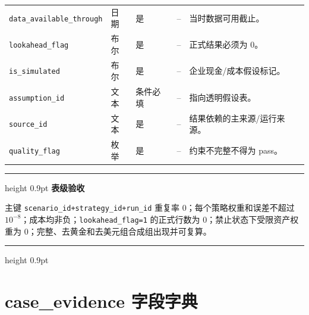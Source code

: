 \documentclass[UTF8,fontset=windows,12pt,openany]{ctexbook}
\newenvironment{gatebox}[1][]{%
  \par\medskip\noindent\begin{center}\begin{minipage}{0.93\textwidth}%
  \color{GoldLine}\hrule height 0.9pt\vspace{0.45em}%
  \textbf{#1}\par\smallskip\color{black}%
}{%
  \par\vspace{0.35em}\color{GoldLine}\hrule height 0.9pt%
  \end{minipage}\end{center}\medskip%
}
\newcommand{\Field}[1]{{\small\nolinkurl{#1}}}
\begin{document}
\begin{landscape}
\begin{longtable}{p{4.0cm}p{2.2cm}p{2.2cm}p{2.5cm}p{7.4cm}}
\Field{data_available_through} & 日期 & 是 & -- & 当时数据可用截止。\\
\Field{lookahead_flag} & 布尔 & 是 & -- & 正式结果必须为 0。\\
\Field{is_simulated} & 布尔 & 是 & -- & 企业现金/成本假设标记。\\
\Field{assumption_id} & 文本 & 条件必填 & -- & 指向透明假设表。\\
\Field{source_id} & 文本 & 是 & -- & 结果依赖的主来源/运行来源。\\
\Field{quality_flag} & 枚举 & 是 & -- & 约束不完整不得为 pass。\\
\bottomrule
\end{longtable}
\end{landscape}

\begin{gatebox}[表级验收]
主键 \Field{scenario_id+strategy_id+run_id} 重复率 0；每个策略权重和误差不超过 \(10^{-8}\)；成本均非负；\Field{lookahead_flag=1} 的正式行数为 0；禁止状态下受限资产权重为 0；完整、去黄金和去美元组合成组出现并可复算。
\end{gatebox}

\chapter{case\_evidence 字段字典}
\end{document}
